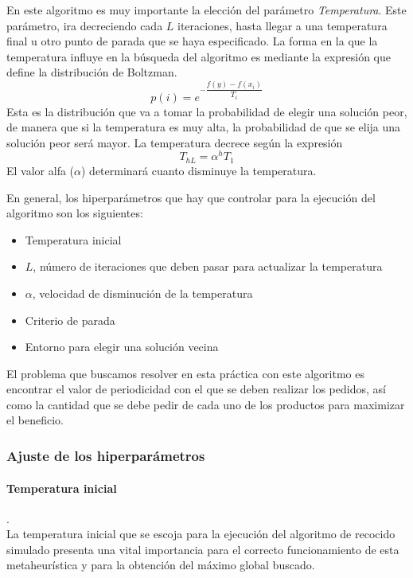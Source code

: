 \documentclass[a4paper,12pt]{article}
\begin{document}
	En este algoritmo es muy importante la elección del parámetro \textit{Temperatura}. Este parámetro, ira decreciendo cada $L$ iteraciones, hasta llegar a una temperatura final u otro punto de parada que se haya especificado. La forma en la que la temperatura influye en la búsqueda del algoritmo es mediante la expresión que define la distribución de Boltzman. 
	$$p(i)=e^{-\dfrac{f(y)-f(x_i)}{T_i}}$$
	Esta es la distribución que va a tomar la probabilidad de elegir una solución peor, de manera que si la temperatura es muy alta, la probabilidad de que se elija una solución peor será mayor. La temperatura decrece según la expresión
	$$T_{hL}=\alpha ^h T_1$$
	El valor alfa ($\alpha$) determinará cuanto disminuye la temperatura.
	
	En general, los hiperparámetros que hay que controlar para la ejecución del algoritmo son los siguientes:
	\begin{itemize}
		\item Temperatura inicial
		\item $L$, número de iteraciones que deben pasar para actualizar la temperatura
		\item $\alpha$, velocidad de disminución de la temperatura
		\item Criterio de parada
		\item Entorno para elegir una solución vecina
	\end{itemize}
	
	El problema que buscamos resolver en esta práctica con este algoritmo es encontrar el valor de periodicidad con el que se deben realizar los pedidos, así como la cantidad que se debe pedir de cada uno de los productos para maximizar el beneficio.
	
	\subsubsection{Ajuste de los hiperparámetros}
	
	\paragraph{Temperatura inicial}.\\
	La temperatura inicial que se escoja para la ejecución del algoritmo de recocido simulado presenta una vital importancia para el correcto funcionamiento de esta metaheurística y para la obtención del máximo global buscado.\\
\end{document}
